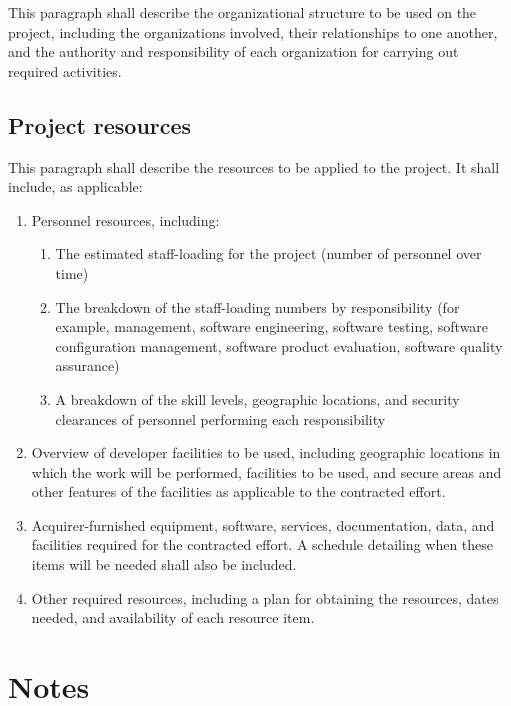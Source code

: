 This paragraph shall describe the organizational structure to be used on
the project, including the organizations involved, their relationships
to one another, and the authority and responsibility of each
organization for carrying out required activities.

\subsection{Project resources}

This paragraph shall describe the resources to be applied to the
project. It shall include, as applicable:

\begin{enumerate}
\itemsep1pt\parskip0pt
\item
  Personnel resources, including:

  \begin{enumerate}
  \itemsep1pt\parskip0pt
  \item
    The estimated staff-loading for the project (number of personnel
    over time)
  \item
    The breakdown of the staff-loading numbers by responsibility (for
    example, management, software engineering, software testing,
    software configuration management, software product evaluation,
    software quality assurance)
  \item
    A breakdown of the skill levels, geographic locations, and security
    clearances of personnel performing each responsibility
  \end{enumerate}
\item
  Overview of developer facilities to be used, including geographic
  locations in which the work will be performed, facilities to be used,
  and secure areas and other features of the facilities as applicable to
  the contracted effort.
\item
  Acquirer-furnished equipment, software, services, documentation, data,
  and facilities required for the contracted effort. A schedule
  detailing when these items will be needed shall also be included.
\item
  Other required resources, including a plan for obtaining the
  resources, dates needed, and availability of each resource item.
\end{enumerate}

\section{Notes}

